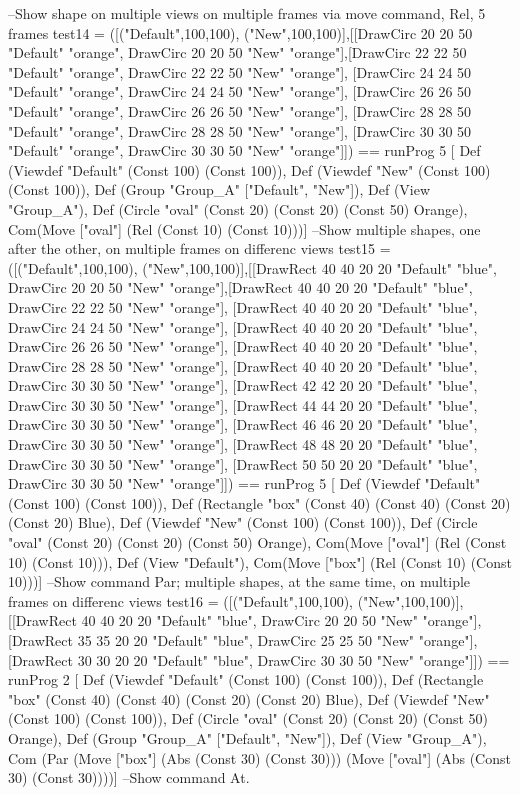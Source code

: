 \documentclass[11pt]{article}
\renewenvironment{verbatim}{}{}
\begin{document}
\begin{verbatim}
--Show shape on multiple views on multiple frames via move command, Rel, 5 frames
test14 = ([("Default",100,100), ("New",100,100)],[[DrawCirc 20 20 50 "Default" "orange", DrawCirc 20 20 50 "New" "orange"],[DrawCirc 22 22 50 "Default" "orange", DrawCirc 22 22 50 "New" "orange"], [DrawCirc 24 24 50 "Default" "orange", DrawCirc 24 24 50 "New" "orange"], [DrawCirc 26 26 50 "Default" "orange", DrawCirc 26 26 50 "New" "orange"], [DrawCirc 28 28 50 "Default" "orange", DrawCirc 28 28 50 "New" "orange"], [DrawCirc 30 30 50 "Default" "orange", DrawCirc 30 30 50 "New" "orange"]]) 
     ==  runProg 5
    [ Def (Viewdef "Default" (Const 100) (Const 100)), Def (Viewdef "New" (Const 100) (Const 100)), Def (Group "Group_A" ["Default", "New"]), Def (View "Group_A"), Def (Circle "oval" (Const 20) (Const 20) (Const 50) Orange), Com(Move ["oval"] (Rel (Const 10) (Const 10)))]
--Show multiple shapes, one after the other, on multiple frames on differenc views
test15 = ([("Default",100,100), ("New",100,100)],[[DrawRect 40 40 20 20 "Default" "blue", DrawCirc 20 20 50 "New" "orange"],[DrawRect 40 40 20 20 "Default" "blue", DrawCirc 22 22 50 "New" "orange"], [DrawRect 40 40 20 20 "Default" "blue", DrawCirc 24 24 50 "New" "orange"], [DrawRect 40 40 20 20 "Default" "blue", DrawCirc 26 26 50 "New" "orange"], [DrawRect 40 40 20 20 "Default" "blue", DrawCirc 28 28 50 "New" "orange"], [DrawRect 40 40 20 20 "Default" "blue", DrawCirc 30 30 50 "New" "orange"], [DrawRect 42 42 20 20 "Default" "blue", DrawCirc 30 30 50 "New" "orange"], [DrawRect 44 44 20 20 "Default" "blue", DrawCirc 30 30 50 "New" "orange"], [DrawRect 46 46 20 20 "Default" "blue", DrawCirc 30 30 50 "New" "orange"], [DrawRect 48 48 20 20 "Default" "blue", DrawCirc 30 30 50 "New" "orange"], [DrawRect 50 50 20 20 "Default" "blue", DrawCirc 30 30 50 "New" "orange"]]) 
     ==  runProg 5
    [ Def (Viewdef "Default" (Const 100) (Const 100)), Def (Rectangle "box" (Const 40) (Const 40) (Const 20) (Const 20) Blue),  Def (Viewdef "New" (Const 100) (Const 100)), Def (Circle "oval" (Const 20) (Const 20) (Const 50) Orange), Com(Move ["oval"] (Rel (Const 10) (Const 10))), Def (View "Default"), Com(Move ["box"] (Rel (Const 10) (Const 10)))]
--Show command Par; multiple shapes, at the same time, on multiple frames on differenc views
test16 = ([("Default",100,100), ("New",100,100)],[[DrawRect 40 40 20 20 "Default" "blue", DrawCirc 20 20 50 "New" "orange"],[DrawRect 35 35 20 20 "Default" "blue", DrawCirc 25 25 50 "New" "orange"], [DrawRect 30 30 20 20 "Default" "blue", DrawCirc 30 30 50 "New" "orange"]]) 
     ==  runProg 2
    [ Def (Viewdef "Default" (Const 100) (Const 100)), Def (Rectangle "box" (Const 40) (Const 40) (Const 20) (Const 20) Blue),  Def (Viewdef "New" (Const 100) (Const 100)), Def (Circle "oval" (Const 20) (Const 20) (Const 50) Orange), Def (Group "Group_A" ["Default", "New"]), Def (View "Group_A"), Com (Par (Move ["box"] (Abs (Const 30) (Const 30))) (Move ["oval"] (Abs (Const 30) (Const 30))))]
--Show command At.


\end{verbatim}
\end{document}
